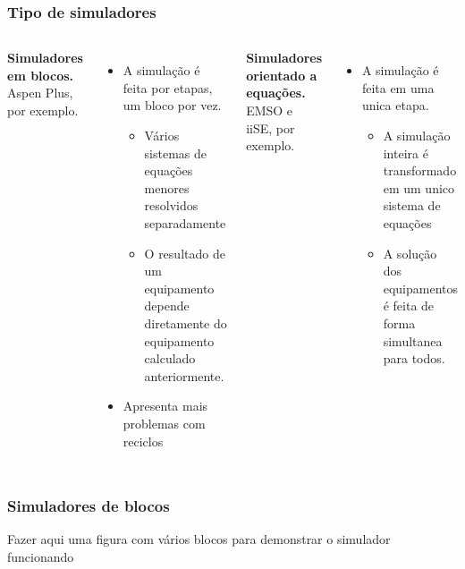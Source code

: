 \documentclass[aspectratio=169]{beamer}
\begin{document}
\begin{frame}
	\frametitle{Tipo de simuladores}
	\begin{columns}[t] 
			\textbf{Simuladores em blocos.}\\
			Aspen Plus, por exemplo.\\
			\begin{itemize}
				\item A simulação é feita por etapas, um bloco por vez.
				\begin{itemize}
					\item Vários sistemas de equações menores resolvidos separadamente
					\item O resultado de um equipamento depende diretamente do 
				equipamento calculado anteriormente.
				\end{itemize}
				\item Apresenta mais problemas com reciclos
			\end{itemize}
			\textbf{Simuladores orientado a equações.}\\
			EMSO e iiSE, por exemplo.\\
			\begin{itemize}
				\item A simulação é feita em uma unica etapa.
				\begin{itemize}
					\item A simulação inteira é transformado em um unico sistema de equações
					\item A solução dos equipamentos é feita de forma simultanea para
					todos.
				\end{itemize}
			\end{itemize}
	\end{columns}
\end{frame}

\begin{frame}
	\frametitle{Simuladores de blocos}
	Fazer aqui uma figura com vários blocos para demonstrar o simulador funcionando
\end{frame}
\end{document}
